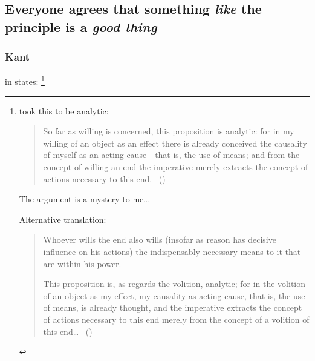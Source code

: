 \documentclass[10pt]{article}
\newcommand{\hozline}[0]{%
  \noindent\hdashrule[0.5ex][c]{\textwidth}{.1pt}{}
}
\begin{document}


\newpage

\hozline

\subsection*{Everyone agrees that something \emph{like} the principle is a \emph{good thing}}
\label{sec:everyone-agrees-that}

\hozline

\subsubsection*{Kant}
\label{sec:kant}

\citeauthor{Kant:1948aa} in  states:\nolinebreak
\footnote{\citeauthor{Kant:1948aa} took this to be analytic:
  \begin{quote}
    So far as willing is concerned, this proposition is analytic: for in my willing of an object as an effect there is already conceived the causality of myself as an acting cause---that is, the use of means; and from the concept of willing an end the imperative merely extracts the concept of actions necessary to this end.\nolinebreak
    \mbox{ }\hfill(\citeyear[81]{Kant:1948aa})
  \end{quote}
  The argument is a mystery to me\dots

  Alternative translation:
\begin{quote}
  Whoever wills the end also wills (insofar as reason has decisive influence on his actions) the indispensably necessary means to it that are within his power.

  This proposition is, as regards the volition, analytic; for in the volition of an object as my effect, my causality as acting cause, that is, the use of means, is already thought, and the imperative extracts the concept of actions necessary to this end merely from the concept of a volition of this end\dots\nolinebreak
  \mbox{ }\hfill(\citeyear[28]{Kant:1997aa})
\end{quote}
}
\end{document}
